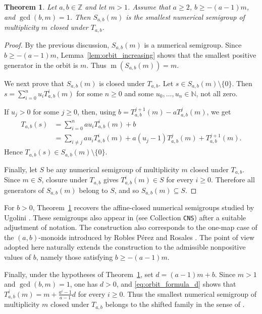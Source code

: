 \documentclass[12pt,a4paper]{amsart}
\newtheorem{theorem}{Theorem}[section]
\theoremstyle{definition}
\begin{document}
\begin{theorem}\label{th:1}
Let $a,b\in\mathbb{Z}$ and let $m>1$. Assume that $a\ge 2$,
$b\ge -(a-1)m$, and $\gcd(b,m)=1$. Then $S_{a,b}(m)$ is the smallest
numerical semigroup of multiplicity $m$ closed under $T_{a,b}$.
\end{theorem}

\begin{proof}
By the previous discussion, $S_{a,b}(m)$ is a numerical semigroup.
Since $b\ge -(a-1)m$, Lemma~\ref{lem:orbit_increasing} shows that the
smallest positive generator in the orbit is $m$. Thus
$\operatorname{m}(S_{a,b}(m))=m$.

We next prove that $S_{a,b}(m)$ is closed under $T_{a,b}$. Let
$s\in S_{a,b}(m)\setminus\{0\}$. Then
$s=\sum_{i=0}^n u_iT^i_{a,b}(m)$ for some $n\ge 0$ and some
$u_0,\ldots,u_n\in\mathbb{N}$, not all zero.

If $u_j>0$ for some $j \geq 0$, then, using
$b=T^{j+1}_{a,b}(m)-aT^j_{a,b}(m)$, we get
\[
\begin{aligned}
T_{a,b}(s)
&=\sum_{i=0}^n au_iT^i_{a,b}(m)+b\\
&=\sum_{i\ne j} au_iT^i_{a,b}(m)
  +a(u_j-1)T^j_{a,b}(m)+T^{j+1}_{a,b}(m).
\end{aligned}
\]
Hence $T_{a,b}(s)\in S_{a,b}(m)\setminus\{0\}$.

Finally, let $S$ be any numerical semigroup of multiplicity $m$ closed
under $T_{a,b}$. Since $m\in S$, closure under $T_{a,b}$ gives
$T^i_{a,b}(m)\in S$ for every $i\ge 0$. Therefore all generators of
$S_{a,b}(m)$ belong to $S$, and so $S_{a,b}(m)\subseteq S$.
\end{proof}

For $b>0$, Theorem~\ref{th:1} recovers the affine-closed numerical
semigroups studied by Ugolini \cite{Ugo17}. These semigroups also appear
in \cite{XIN} (see Collection \texttt{CNS}) after a suitable adjustment
of notation. The construction also corresponds to the one-map case of
the $(a,b)$-monoids introduced by Robles P\'erez and Rosales
\cite{RoblesRosales18}. The point of view adopted here naturally extends
the construction to the admissible nonpositive values of $b$, namely
those satisfying $b\ge -(a-1)m$.

Finally, under the hypotheses of Theorem~\ref{th:1}, set
$d=(a-1)m+b$. Since $m>1$ and $\gcd(b,m)=1$, one has $d>0$, and
\eqref{eq:orbit_formula_d} shows that
$T^i_{a,b}(m)=m+\frac{a^i-1}{a-1}d$ for every $i\ge 0$. Thus the
smallest numerical semigroup of multiplicity $m$ closed under
$T_{a,b}$ belongs to the shifted family in the sense of
\cite{ONeillPelayo18}.
\end{document}
